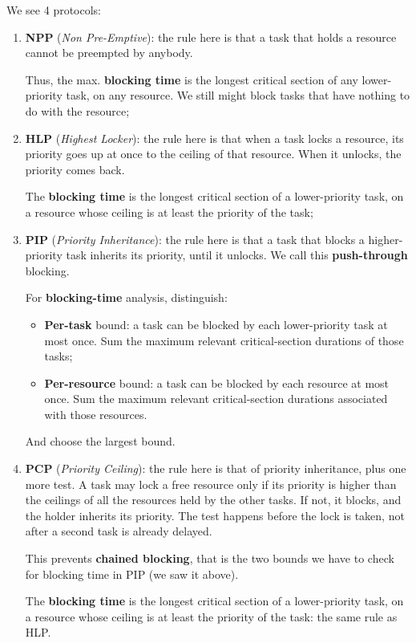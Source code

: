\documentclass[a4paper,11pt]{article}
\begin{document}
We see 4 protocols:
\begin{enumerate}
	\item \textbf{NPP} (\textit{Non Pre-Emptive}): the rule here is that a task that holds a resource cannot be preempted by anybody.

		Thus, the max. \textbf{blocking time} is the longest critical section of any lower-priority task, on any resource. We still might block tasks that have nothing to do with the resource;
	\item \textbf{HLP} (\textit{Highest Locker}): the rule here is that when a task locks a resource, its priority goes up at once to the ceiling of that resource. When it unlocks, the priority comes back. 

		The \textbf{blocking time} is the longest critical section of a lower-priority task, on a resource whose ceiling is at least the priority of the task;
	\item \textbf{PIP} (\textit{Priority Inheritance}): the rule here is that a task that blocks a higher-priority task inherits its priority, until it unlocks. We call this \textbf{push-through} blocking.

		For \textbf{blocking-time} analysis, distinguish:
		\begin{itemize}
			\item \textbf{Per-task} bound: a task can be blocked by each lower-priority task at most once. Sum the maximum relevant critical-section durations of those tasks;
			\item \textbf{Per-resource} bound: a task can be blocked by each resource at most once. Sum the maximum relevant critical-section durations associated with those resources.
		\end{itemize}
		And choose the largest bound.
	\item \textbf{PCP} (\textit{Priority Ceiling}): the rule here is that of priority inheritance, plus one more test. A task may lock a free resource only if its priority is higher than the ceilings of all the resources held by the other tasks. If not, it blocks, and the holder inherits its priority. The test happens before the lock is taken, not after a second task is already delayed.

		This prevents \textbf{chained blocking}, that is the two bounds we have to check for blocking time in PIP (we saw it above).

		The \textbf{blocking time} is the longest critical section of a lower-priority task, on a resource whose ceiling is at least the priority of the task: the same rule as HLP.
\end{enumerate}
\end{document}
